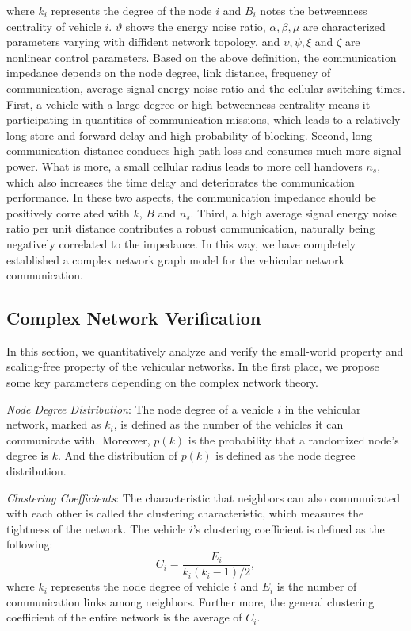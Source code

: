 \documentclass[journal,12pt,draftclsnofoot,onecolumn]{IEEEtran}
\begin{document}
where $k_{i}$ represents the degree of the node $i$ and $B_{i}$ notes the betweenness centrality of vehicle $i$. $\vartheta$ shows the energy noise ratio, $\alpha, \beta, \mu$ are characterized parameters varying with diffident network topology, and $\upsilon, \psi, \xi$ and $\zeta$ are nonlinear control parameters. Based on the above definition, the communication impedance depends on the node degree, link distance, frequency of communication, average signal energy noise ratio and the cellular switching times. First, a vehicle with a large degree or high betweenness centrality means it participating in quantities of communication missions, which leads to a relatively long store-and-forward delay and high probability of blocking. Second, long communication distance conduces high path loss and consumes much more signal power. What is more, a small cellular radius leads to more cell handovers $n_{s}$, which also increases the time delay and deteriorates the communication performance. In these two aspects, the communication impedance should be positively correlated with $k$, $B$ and $n_{s}$. Third, a high average signal energy noise ratio per unit distance contributes a robust communication, naturally being negatively correlated to the impedance.
In this way, we have completely established a complex network graph model for the vehicular network communication.

\subsection{Complex Network Verification}
\label{3-3}
In this section, we quantitatively analyze and verify the small-world property and scaling-free property of the vehicular networks.
In the first place, we propose some key parameters depending on the complex network theory.


\emph{Node Degree Distribution}: The node degree of a vehicle $i$ in the vehicular network, marked as $k_{i}$, is defined as the number of the vehicles it can communicate with. Moreover, $p(k)$ is the probability that a randomized node's degree is $k$. And the distribution of $p(k)$ is defined as the node degree distribution.

\emph{Clustering Coefficients}: The characteristic that neighbors can also communicated with each other is called the clustering characteristic, which measures the tightness of the network. The vehicle $i$'s clustering coefficient is defined as the following:
\begin{equation}\label{16}
{{C}_{i}}=\frac{{{E}_{i}}}{{{k}_{i}}({{k}_{i}}-1)/2},
\end{equation}
where $k_{i}$ represents the node degree of vehicle $i$ and ${E}_{i}$ is the number of communication links among neighbors. Further more, the general clustering coefficient of the entire network is the average of ${C}_{i}$.
\end{document}
